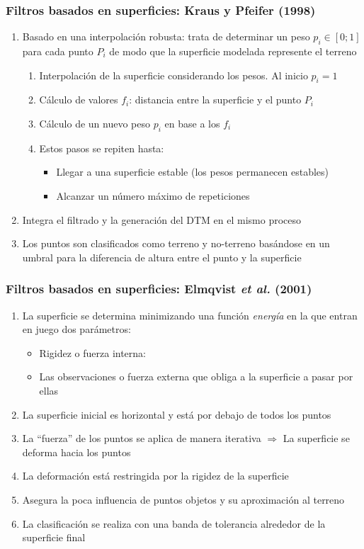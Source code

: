 \begin{frame}
  \frametitle{Filtros basados en superficies: Kraus y Pfeifer (1998)}
  \begin{enumerate}
    \item Basado en una \alert{interpolación robusta}: trata de determinar un peso 
      $p_i \in [0;1]$ para cada punto $P_i$ de modo que la superficie 
      modelada represente el terreno
      \begin{enumerate}
        \item Interpolación de la superficie considerando los pesos. Al inicio
          $p_i = 1$
        \item Cálculo de valores $f_i$: distancia entre la superficie y el punto $P_i$
        \item Cálculo de un nuevo peso $p_i$ en base a los $f_i$
        \item Estos pasos se repiten hasta:
          \begin{itemize}
            \item Llegar a una superficie estable (los pesos permanecen estables)
            \item Alcanzar un número máximo de repeticiones
          \end{itemize}
      \end{enumerate}
    \item Integra el filtrado y la generación del DTM en el mismo proceso
    \item Los puntos son clasificados como terreno y no-terreno basándose en un
      umbral para la diferencia de altura entre el punto y la superficie
  \end{enumerate}
\end{frame}
\begin{frame}
  \frametitle{Filtros basados en superficies: Elmqvist \emph{et al.} (2001)}
  \begin{enumerate}
    \item La superficie se determina minimizando una función
      \alert{\emph{energía}} en la que entran en juego dos parámetros:
      \begin{itemize}
        \item \alert{Rigidez} o fuerza interna:
        \item Las observaciones o fuerza externa que obliga a la superficie a
          pasar por ellas
      \end{itemize}
     \item La superficie inicial es horizontal y está por debajo de todos los
       puntos
     \item La ``fuerza'' de los puntos se aplica de manera iterativa
       $\Rightarrow$ La superficie se deforma hacia los puntos
     \item La deformación está restringida por la rigidez de la superficie
     \item Asegura la poca influencia de puntos objetos y su aproximación al
       terreno
     \item La clasificación se realiza con una banda de tolerancia alrededor de
       la superficie final
  \end{enumerate}
\end{frame}
